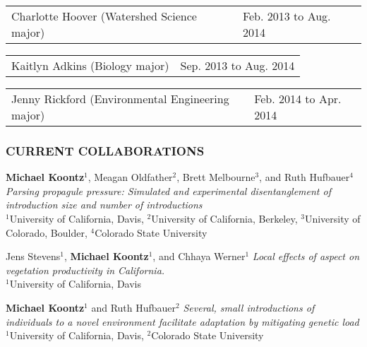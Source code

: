 \documentclass[11pt,english]{article}
\providecommand{\tabularnewline}{\\}
\begin{document}
\begin{tabular}{>{\raggedright}p{4in}>{\raggedleft}p{2in}}
Charlotte Hoover (Watershed Science major) & Feb. 2013 to Aug. 2014 \tabularnewline
\end{tabular}

\begin{tabular}{>{\raggedright}p{4in}>{\raggedleft}p{2in}}
Kaitlyn Adkins (Biology major) & Sep. 2013 to Aug. 2014\tabularnewline
\end{tabular}

\begin{tabular}{>{\raggedright}p{4in}>{\raggedleft}p{2in}}
Jenny Rickford (Environmental Engineering major) & Feb. 2014 to Apr. 2014
\end{tabular}


\subsubsection*{CURRENT COLLABORATIONS}
\vspace{-0.5ex}

\begin{hangparas}{0.4in}{1}

\hspace{0.575em}\textbf{Michael Koontz}$^{1}$, Meagan Oldfather$^{2}$, Brett Melbourne$^{3}$, and Ruth Hufbauer$^{4}$
\emph{Parsing propagule pressure: Simulated and experimental disentanglement of introduction size and number of introductions} \tabularnewline
$^{1}$University of California, Davis, $^{2}$University of California, Berkeley, $^{3}$University of Colorado, Boulder, $^{4}$Colorado State University 

\hspace{0.575em}Jens Stevens$^{1}$, \textbf{Michael Koontz}$^{1}$, and Chhaya Werner$^{1}$
\emph{Local effects of aspect on vegetation productivity in California.}\tabularnewline
$^{1}$University of California, Davis

\hspace{0.575em}\textbf{Michael Koontz}$^{1}$ and Ruth Hufbauer$^{2}$
\emph{Several, small introductions of individuals to a novel environment facilitate adaptation by mitigating genetic load} \tabularnewline
$^{1}$University of California, Davis, $^{2}$Colorado State University 

%

\end{hangparas}
\vspace{1ex}
\end{document}
